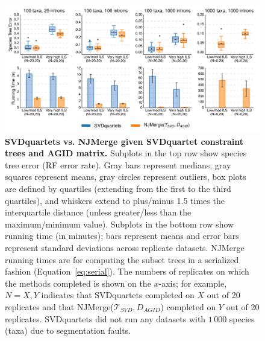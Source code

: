 \begin{figure}[!h]
\centering
\includegraphics[width=\textwidth]{figures/njmerge-fig9.pdf}
\caption{
{\bf SVDquartets vs. NJMerge given SVDquartet constraint trees and AGID matrix. }
Subplots in the top row show species tree error (RF error rate).
Gray bars represent medians, gray squares represent means, gray circles represent outliers, box plots are defined by quartiles (extending from the first to the third quartiles), and whiskers extend to plus/minus 1.5 times the interquartile distance (unless greater/less than the maximum/minimum value).
Subplots in the bottom row show running time (in minutes); bars represent means and error bars represent standard deviations across replicate datasets.
NJMerge running times are for computing the subset trees in a  serialized fashion (Equation~\ref{eq:serial}).
The numbers of replicates on which the methods completed is shown on the $x$-axis; for example, $N=X,Y$ indicates that SVDquartets completed on $X$ out of 20 replicates and that NJMerge($\mathcal{T}_{SVD},D_{AGID}$) completed on $Y$ out of 20 replicates.
SVDquartets did not run any datasets with $1\,000$ species (taxa) due to segmentation faults.
}
\label{fig:svdq-intron}
\end{figure}

